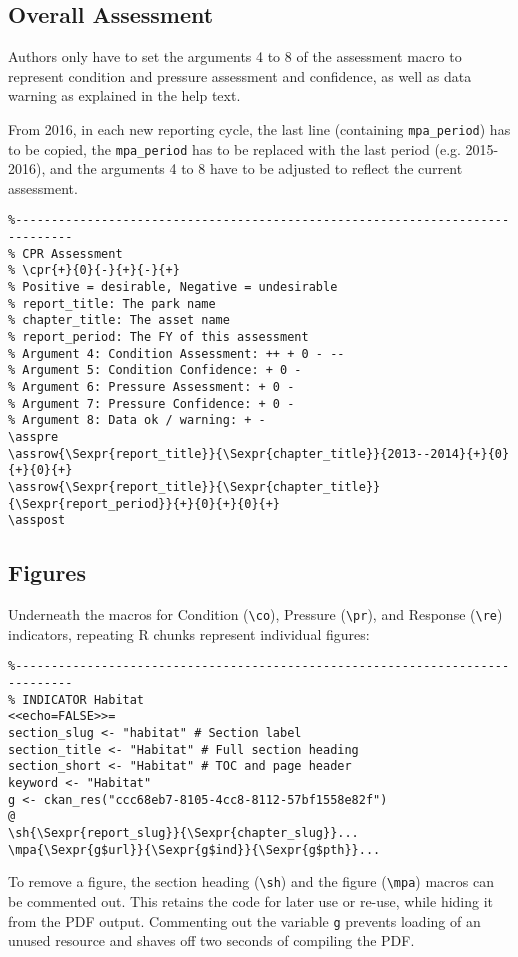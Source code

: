 \subsection*{Overall Assessment}
Authors only have to set the arguments 4 to 8 of the assessment macro to represent
condition and pressure assessment and confidence, as well as data warning as
explained in the help text.

From 2016, in each new reporting cycle, the last line (containing \texttt{mpa\_period})
has to be copied, the \texttt{mpa\_period} has to be replaced with the last period
(e.g. 2015-2016), and the arguments 4 to 8 have to be adjusted to reflect the current
assessment.

{\small\begin{verbatim}
%------------------------------------------------------------------------------
% CPR Assessment
% \cpr{+}{0}{-}{+}{-}{+}
% Positive = desirable, Negative = undesirable
% report_title: The park name
% chapter_title: The asset name
% report_period: The FY of this assessment
% Argument 4: Condition Assessment: ++ + 0 - --
% Argument 5: Condition Confidence: + 0 -
% Argument 6: Pressure Assessment: + 0 -
% Argument 7: Pressure Confidence: + 0 -
% Argument 8: Data ok / warning: + -
\asspre
\assrow{\Sexpr{report_title}}{\Sexpr{chapter_title}}{2013--2014}{+}{0}{+}{0}{+}
\assrow{\Sexpr{report_title}}{\Sexpr{chapter_title}}{\Sexpr{report_period}}{+}{0}{+}{0}{+}
\asspost
\end{verbatim}}

\subsection*{Figures}
Underneath the macros for Condition (\texttt{\textbackslash co}),
Pressure (\texttt{\textbackslash pr}), and Response (\texttt{\textbackslash re})
indicators, repeating R chunks represent individual figures:

{\small\begin{verbatim}
%------------------------------------------------------------------------------
% INDICATOR Habitat
<<echo=FALSE>>=
section_slug <- "habitat" # Section label
section_title <- "Habitat" # Full section heading
section_short <- "Habitat" # TOC and page header
keyword <- "Habitat"
g <- ckan_res("ccc68eb7-8105-4cc8-8112-57bf1558e82f")
@
\sh{\Sexpr{report_slug}}{\Sexpr{chapter_slug}}...
\mpa{\Sexpr{g$url}}{\Sexpr{g$ind}}{\Sexpr{g$pth}}...
\end{verbatim}}

To remove a figure, the section heading (\texttt{\textbackslash sh}) and the
figure (\texttt{\textbackslash mpa}) macros can be commented out.
This retains the code for later use or re-use, while hiding it from the PDF output.
Commenting out the variable \texttt{g} prevents loading of an unused resource and
shaves off two seconds of compiling the PDF.

